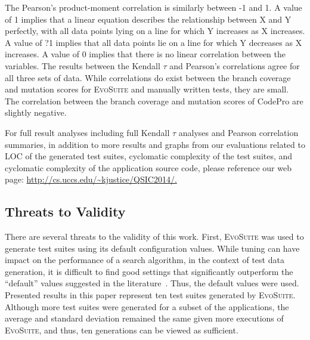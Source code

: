 The Pearson's product-moment correlation is similarly between -1 and 1.  A value of 1 implies that a linear equation describes the relationship between X and Y perfectly, with all data points lying on a line for which Y increases as X increases.  A value of ?1 implies that all data points lie on a line for which Y decreases as X increases. A value of 0 implies that there is no linear correlation between the variables. The results between the Kendall $\tau$ and Pearson's correlations agree for all three sets of data.  While correlations do exist between the branch coverage and mutation scores for \textsc{EvoSuite} and manually written tests, they are small.  The correlation between the branch coverage and mutation scores of CodePro are slightly negative.  



For full result analyses including full Kendall $\tau$ analyses and Pearson correlation summaries, in addition to more results and graphs from our evaluations related to LOC of the generated test suites, cyclomatic complexity of the test suites, and cyclomatic complexity of the application source code, please reference our web page: \url{http://cs.uccs.edu/~kjustice/QSIC2014/.}

\subsection{Threats to Validity}
There are several threats to the validity of this work.
First, \textsc{EvoSuite} was used to generate test suites using its default configuration values. While tuning can have impact on the performance of a search algorithm, in the context of test data generation, it is difficult to find good settings that significantly outperform the ``default'' values suggested in the literature~\cite{arcuri2013}.  Thus, the default values were used.  Presented results in this paper represent ten test suites generated by \textsc{EvoSuite}.  Although more test suites were generated for a subset of the applications, the average and standard deviation remained the same given more executions of \textsc{EvoSuite}, and thus, ten generations can be viewed as sufficient.

